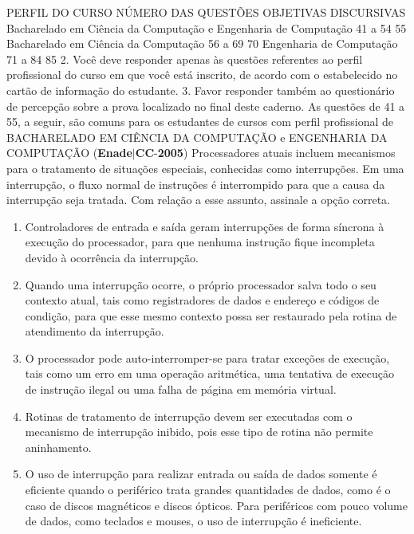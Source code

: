 \documentclass{exam}
\begin{document}
\begin{questions}
PERFIL DO CURSO
NÚMERO DAS QUESTÕES
OBJETIVAS DISCURSIVAS
Bacharelado em Ciência da Computação e
Engenharia de Computação
41 a 54 55
Bacharelado em Ciência da Computação 56 a 69 70
Engenharia de Computação 71 a 84 85
2. Você deve responder apenas às questões referentes ao perfil profissional do curso em que
você está inscrito, de acordo com o estabelecido no cartão de informação do estudante.
3. Favor responder também ao questionário de percepção sobre a prova localizado no final
deste caderno.
As questões de 41 a 55, a seguir, são comuns para os estudantes de cursos com perfil profissional de
BACHARELADO EM CIÊNCIA DA COMPUTAÇÃO e ENGENHARIA DA COMPUTAÇÃO
\question (\textbf{Enade}$|$\textbf{CC}-\textbf{2005}) Processadores atuais incluem mecanismos para o tratamento
de situações especiais, conhecidas como interrupções. Em uma
interrupção, o fluxo normal de instruções é interrompido para
que a causa da interrupção seja tratada. Com relação a esse
assunto, assinale a opção correta.
	\begin{enumerate}[label=\alph*)]
		\item  Controladores de entrada e saída geram interrupções de
forma síncrona à execução do processador, para que
nenhuma instrução fique incompleta devido à ocorrência
da interrupção.
		\item  Quando uma interrupção ocorre, o próprio processador
salva todo o seu contexto atual, tais como registradores de
dados e endereço e códigos de condição, para que esse
mesmo contexto possa ser restaurado pela rotina de
atendimento da interrupção.
		\item  O processador pode auto-interromper-se para tratar
exceções de execução, tais como um erro em uma
operação aritmética, uma tentativa de execução de
instrução ilegal ou uma falha de página em memória
virtual.
		\item  Rotinas de tratamento de interrupção devem ser executadas
com o mecanismo de interrupção inibido, pois esse tipo de
rotina não permite aninhamento.
		\item  O uso de interrupção para realizar entrada ou saída de
dados somente é eficiente quando o periférico trata
grandes quantidades de dados, como é o caso de discos
magnéticos e discos ópticos. Para periféricos com pouco
volume de dados, como teclados e mouses, o uso de
interrupção é ineficiente.

	\end{enumerate}


\end{questions}
\end{document}
